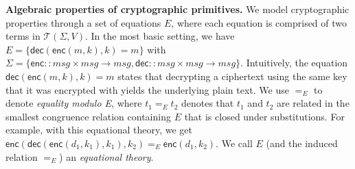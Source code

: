 \documentclass{article}
\theoremstyle{definition}
\begin{document}
\textbf{Algebraic properties of cryptographic primitives.} We model cryptographic properties through a set 
of equations $E$, 
where each equation is comprised of two terms in $\mathcal{T}(\Sigma, V)$. 
In the most basic setting, we have $E = \{ \mathsf{dec}(\mathsf{enc}(m, k), k) = m \}$ 
with 
$\Sigma = \{ \mathsf{enc} :: \mathit{msg} \times \mathit{msg} \rightarrow \mathit{msg}, 
\mathsf{dec} :: \mathit{msg} \times \mathit{msg} \rightarrow \mathit{msg} \}$. 
Intuitively, the equation $\mathsf{dec}(\mathsf{enc}(m, k), k) = m$ states that decrypting a ciphertext 
using the same key that it was encrypted with yields the underlying plain text. 
We use $=_E$ to denote \textit{equality modulo E}, where $t_1 =_E t_2$ denotes that $t_1$ and $t_2$ 
are related in the smallest congruence relation containing $E$ that is closed under substitutions. 
For example, with this equational theory, 
we get $\mathsf{enc}(\mathsf{dec}(\mathsf{enc}(d_1, k_1), k_1), k_2) =_E \mathsf{enc}(d_1, k_2)$.
We call $E$ (and the induced relation $=_E$) an \emph{equational theory}.
\end{document}

